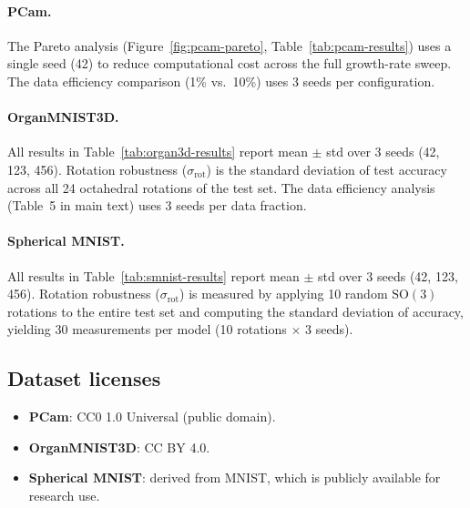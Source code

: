 \documentclass{article}
\newcommand{\SO}{\mathrm{SO}}
\begin{document}
\paragraph{PCam.}
The Pareto analysis (Figure~\ref{fig:pcam-pareto},
Table~\ref{tab:pcam-results}) uses a single seed (42) to reduce
computational cost across the full growth-rate sweep. The data
efficiency comparison (1\% vs.\ 10\%) uses 3 seeds per configuration.

\paragraph{OrganMNIST3D.}
All results in Table~\ref{tab:organ3d-results} report mean $\pm$ std
over 3 seeds (42, 123, 456). Rotation robustness
($\sigma_{\mathrm{rot}}$) is the standard deviation of test accuracy
across all 24 octahedral rotations of the test set. The data
efficiency analysis (Table~5 in main text) uses 3 seeds per data
fraction.

\paragraph{Spherical MNIST.}
All results in Table~\ref{tab:smnist-results} report mean $\pm$ std
over 3 seeds (42, 123, 456). Rotation robustness
($\sigma_{\mathrm{rot}}$) is measured by applying 10 random $\SO(3)$
rotations to the entire test set and computing the standard deviation
of accuracy, yielding 30 measurements per model (10 rotations
$\times$ 3 seeds).

\subsection{Dataset licenses}

\begin{itemize}[nosep]
  \item \textbf{PCam}: CC0 1.0 Universal (public domain).
  \item \textbf{OrganMNIST3D}: CC BY 4.0.
  \item \textbf{Spherical MNIST}: derived from MNIST, which is
    publicly available for research use.
\end{itemize}

\newpage

\end{document}
